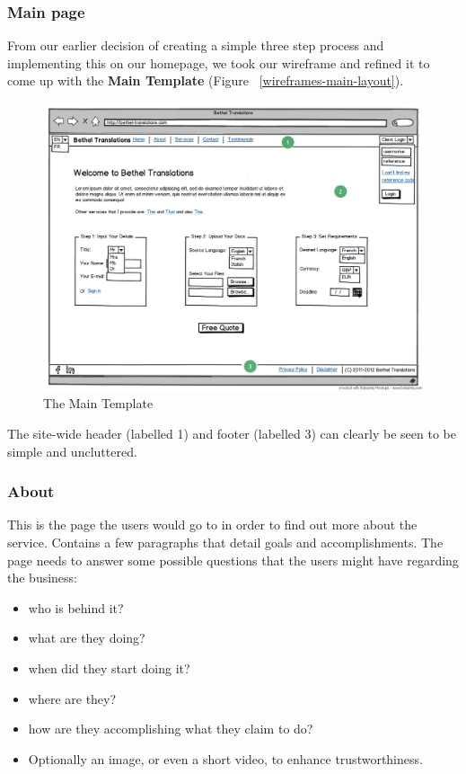 \documentclass{l3proj}
\begin{document}
\subsubsection{Main page}
From our earlier decision of creating a simple three step process and
implementing this on our homepage, we took our wireframe and refined it to
come up with the  \textbf{Main Template} (Figure ~\ref{wireframes-main-layout}).

\begin{figure}[ht]
\label{wireframes:main-template}
\begin{center}
\includegraphics[width=\linewidth]{wireframes/bt-homepagev3}
\caption{The Main Template}
\end{center}
\end{figure}

The site-wide header (labelled 1) and footer (labelled 3) can clearly be seen to
be simple and uncluttered.


\subsubsection{About}
This is the page the users would go to in order to find out more about the
service. Contains a few paragraphs that detail goals and accomplishments.
The page needs to answer some possible questions that the users might have
regarding the business:
\begin{itemize}
	\item who is behind it?
	\item what are they doing?
	\item when did they start doing it?
	\item where are they?
	\item how are they accomplishing what they claim to do?
	\item Optionally an image, or even a short video, to enhance trustworthiness.
\end{itemize}
\end{document}
